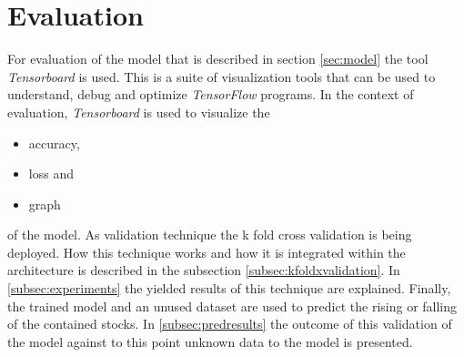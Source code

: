 \section{Evaluation}
\label{sec:evaluation}
For evaluation of the model that is described in section \ref{sec:model} the tool \textit{Tensorboard} is used. This is a suite of visualization tools that can be used to understand, debug and optimize \textit{TensorFlow} programs. In the context of evaluation, \textit{Tensorboard} is used to visualize the 
\begin{itemize}
	\item accuracy,
	\item loss and
	\item graph
\end{itemize}
of the model. As validation technique the k fold cross validation is being deployed. How this technique works and how it is integrated within the architecture is described in the subsection \ref{subsec:kfoldxvalidation}. In \ref{subsec:experiments} the yielded results of this technique are explained. Finally, the trained model and an unused dataset are used to predict the rising or falling of the contained stocks. In \ref{subsec:predresults} the outcome of this validation of the model against to this point unknown data to the model is presented. 

